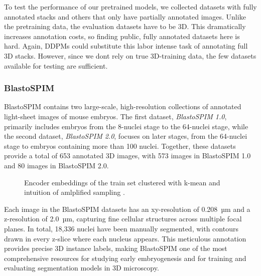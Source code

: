 To test the performance of our pretrained models, we collected datasets with fully annotated stacks and others that only have partially annotated images. Unlike the pretraining data, the evaluation datasets have to be 3D. This dramatically increases annotation costs, so finding public, fully annotated datasets here is hard. Again, DDPMs could substitute this labor intense task of annotating full 3D stacks. However, since we dont rely on true 3D-training data, the few datasets available for testing are sufficient.

\subsubsection{BlastoSPIM}

BlastoSPIM contains two large-scale, high-resolution collections of annotated light-sheet images of mouse embryos.
The first dataset, \textit{BlastoSPIM 1.0}, primarily includes embryos from the 8-nuclei stage to the 64-nuclei stage, while the second dataset, \textit{BlastoSPIM 2.0}, focuses on later stages, from the 64-nuclei stage to embryos containing more than 100 nuclei. Together, these datasets provide a total of 653 annotated 3D images, with 573 images in BlastoSPIM 1.0 and 80 images in BlastoSPIM 2.0.

\begin{figure}[!ht]
    \centering
    \caption{Encoder embeddings of the train set clustered with k-mean and intuition of amlplified sampling \cite{LeCun.1989}.}
    \label{fig:slicing}
\end{figure}

Each image in the BlastoSPIM datasets has an xy-resolution of 0.208~µm and a z-resolution of 2.0~µm, capturing fine cellular structures across multiple focal planes. In total, 18,336 nuclei have been manually segmented, with contours drawn in every z-slice where each nucleus appears. This meticulous annotation provides precise 3D instance labels, making BlastoSPIM one of the most comprehensive resources for studying early embryogenesis and for training and evaluating segmentation models in 3D microscopy. 



